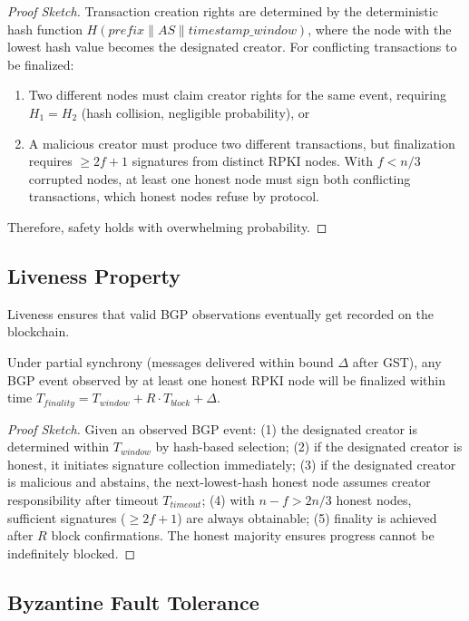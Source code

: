 \begin{proof}[Proof Sketch]
Transaction creation rights are determined by the deterministic hash function $H(prefix \| AS \| timestamp\_window)$, where the node with the lowest hash value becomes the designated creator. For conflicting transactions to be finalized:
\begin{enumerate}
    \item Two different nodes must claim creator rights for the same event, requiring $H_1 = H_2$ (hash collision, negligible probability), or
    \item A malicious creator must produce two different transactions, but finalization requires $\geq 2f+1$ signatures from distinct RPKI nodes. With $f < n/3$ corrupted nodes, at least one honest node must sign both conflicting transactions, which honest nodes refuse by protocol.
\end{enumerate}
Therefore, safety holds with overwhelming probability.
\end{proof}

\subsection{Liveness Property}

Liveness ensures that valid BGP observations eventually get recorded on the blockchain.

\begin{theorem}
Under partial synchrony (messages delivered within bound $\Delta$ after GST), any BGP event observed by at least one honest RPKI node will be finalized within time $T_{finality} = T_{window} + R \cdot T_{block} + \Delta$.
\end{theorem}

\begin{proof}[Proof Sketch]
Given an observed BGP event: (1) the designated creator is determined within $T_{window}$ by hash-based selection; (2) if the designated creator is honest, it initiates signature collection immediately; (3) if the designated creator is malicious and abstains, the next-lowest-hash honest node assumes creator responsibility after timeout $T_{timeout}$; (4) with $n - f > 2n/3$ honest nodes, sufficient signatures ($\geq 2f+1$) are always obtainable; (5) finality is achieved after $R$ block confirmations. The honest majority ensures progress cannot be indefinitely blocked.
\end{proof}

\subsection{Byzantine Fault Tolerance}

